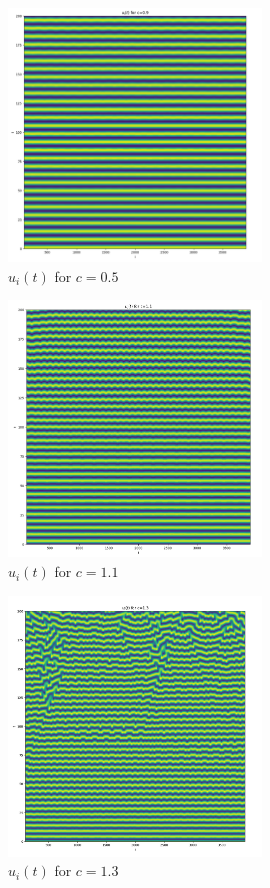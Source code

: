 \documentclass[a4paper, oneside]{book}
\begin{document}
\begin{figure}[htpb]
    \centering
    \includegraphics[width=0.6\textwidth]{./images/Pasted image 20231207115846.png}
    \caption{$u_i(t)$ for $c=0.5$}
\end{figure}

\begin{figure}[htpb]
    \centering
    \includegraphics[width=0.6\textwidth]{./images/Pasted image 20231207115932.png}
    \caption{$u_i(t)$ for $c=1.1$}
\end{figure}

\begin{figure}[htpb]
    \centering
    \includegraphics[width=0.6\textwidth]{./images/Pasted image 20231207120004.png}
    \caption{$u_i(t)$ for $c=1.3$}
\end{figure}
\end{document}
